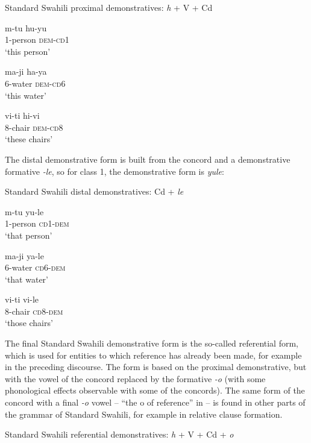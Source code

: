 \documentclass[output=paper]{langscibook}
\begin{document}
\ea\label{ex:marten:9}
Standard Swahili proximal demonstratives: \textit{h} + V + Cd

    \ea\label{ex:marten:9a} \gll   m-tu      hu-yu \\
    1-person    \textsc{dem}{}-\textsc{cd}1\\
    \glt ‘this person’

    \ex\label{ex:marten:9b} \gll   ma-ji      ha-ya \\
    6-water    \textsc{dem}{}-\textsc{cd}6\\
    \glt ‘this water’

    \ex\label{ex:marten:9c} \gll  vi-ti      hi-vi  \\
      8-chair    \textsc{dem}{}-\textsc{cd}8\\
    \glt ‘these chairs’
        \z
\z

The distal demonstrative form is built from the concord and a demonstrative formative \textit{{}-le}, so for class 1, the demonstrative form is \textit{yule}:

\ea\label{ex:marten:10} Standard Swahili distal demonstratives: Cd + \textit{le}

    \ea\label{ex:marten:10a} \gll  m-tu      yu-le\\  
    1-person    \textsc{cd}1-\textsc{dem}\\
    \glt ‘that person’

    \ex\label{ex:marten:10b} \gll  ma-ji      ya-le \\
    6-water    \textsc{cd}6-\textsc{dem}\\
    \glt ‘that water’

    \ex\label{ex:marten:10c} \gll  vi-ti      vi-le \\
      8-chair    \textsc{cd}8-\textsc{dem}\\
    \glt ‘those chairs’
    \z
\z

The final Standard Swahili demonstrative form is the so-called referential form, which is used for entities to which reference has already been made, for example in the preceding discourse. The form is based on the proximal demonstrative, but with the vowel of the concord replaced by the formative \textit{{}-o} (with some phonological effects observable with some of the concords). The same form of the concord with a final \textit{{}-o} vowel -- ``the o of reference'' in \citet{Ashton1947} -- is found in other parts of the grammar of Standard Swahili, for example in relative clause formation. 

\ea\label{ex:marten:11}
Standard Swahili referential demonstratives: \textit{h} + V + Cd + \textit{o}
\end{document}
